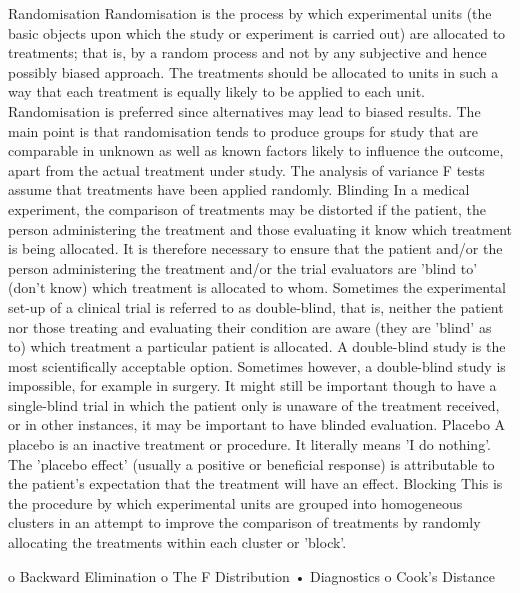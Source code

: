Randomisation 
Randomisation is the process by which experimental units (the basic objects upon which the study or experiment is carried out) are allocated to treatments; that is, by a random process and not by any subjective and hence possibly biased approach. The treatments should be allocated to units in such a way that each treatment is equally likely to be applied to each unit.
Randomisation is preferred since alternatives may lead to biased results.
The main point is that randomisation tends to produce groups for study that are comparable in unknown as well as known factors likely to influence the outcome, apart from the actual treatment under study. The analysis of variance F tests assume that treatments have been applied randomly.
Blinding 
In a medical experiment, the comparison of treatments may be distorted if the patient, the person administering the treatment and those evaluating it know which treatment is being allocated. It is therefore necessary to ensure that the patient and/or the person administering the treatment and/or the trial evaluators are 'blind to' (don't know) which treatment is allocated to whom.
Sometimes the experimental set-up of a clinical trial is referred to as double-blind, that is, neither the patient nor those treating and evaluating their condition are aware (they are 'blind' as to) which treatment a particular patient is allocated. A double-blind study is the most scientifically acceptable option.
Sometimes however, a double-blind study is impossible, for example in surgery. It might still be important though to have a single-blind trial in which the patient only is unaware of the treatment received, or in other instances, it may be important to have blinded evaluation.
Placebo 
A placebo is an inactive treatment or procedure. It literally means 'I do nothing'. The 'placebo effect' (usually a positive or beneficial response) is attributable to the patient's expectation that the treatment will have an effect.
Blocking 
This is the procedure by which experimental units are grouped into homogeneous clusters in an attempt to improve the comparison of treatments by randomly allocating the treatments within each cluster or 'block'.

o	Backward Elimination
o	The F Distribution
•	Diagnostics
o	Cook’s Distance

